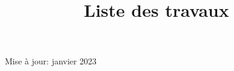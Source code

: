 \documentclass[a4paper,12pt]{curve}
\title{Liste des travaux}
\begin{document}
            \makeheaders[t]
            \maketitle
            \begin{center}
Mise à jour: janvier 2023
\end{center}
            \vfill
            
\end{document}
